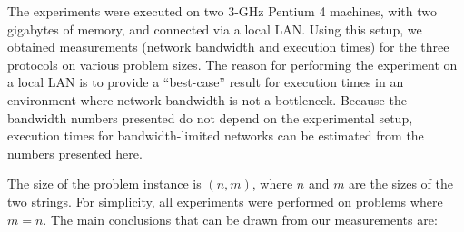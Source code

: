 The experiments were executed on two 3-GHz Pentium 4 machines, with two
gigabytes of memory, and connected via a local LAN. Using this setup,
we obtained measurements (network bandwidth and execution times) for
the three protocols on various problem sizes. The reason for performing
the experiment on a local LAN is to provide a ``best-case'' result
for execution times in an environment where network bandwidth is not
a bottleneck.  Because the bandwidth numbers presented do not depend on
the experimental setup, execution times for bandwidth-limited networks
can be estimated from the numbers presented here.

The size of the problem instance is $(n,m)$, where $n$ and $m$
are the sizes of the two strings. For simplicity, all experiments
were performed on problems where $m=n$. The main conclusions that
can be drawn from our measurements are:

